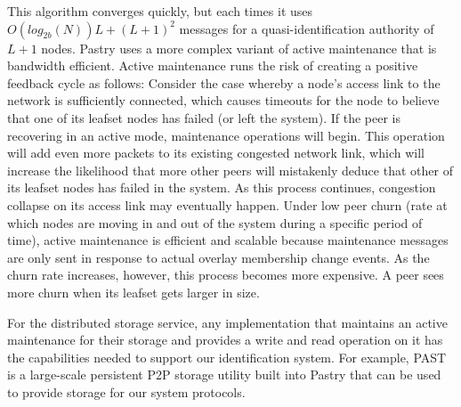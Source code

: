  This algorithm converges quickly, but each times it uses $O(log_{2b}(N))L + (L+1)^2$ messages
for a quasi-identification authority of $L+1$ nodes.
Pastry uses a more complex variant of active maintenance that is
bandwidth efficient.
Active maintenance runs the risk of creating a positive feedback cycle as
follows: Consider the case whereby a node's access link to the network is
sufficiently connected, which causes timeouts for the node to believe that one
of its leafset nodes has failed (or left the system). If the peer is recovering
in an active mode, maintenance operations will begin. This operation will add
even more packets to its existing congested network link, which will increase
the likelihood that more other peers will mistakenly deduce that other of its leafset
nodes has failed in the system. As this process continues, congestion collapse
on its access link may eventually happen.
Under low peer churn (rate at which nodes are moving in and out of the
system during a specific period of time), active maintenance is efficient and scalable because
maintenance messages are only sent in response to actual overlay membership
change events. As the churn rate increases, however, this process becomes more
expensive. A peer sees more churn when its leafset gets larger in size.

For the distributed storage service, any implementation that maintains an
active maintenance for their storage and provides a write and read operation on
it has the capabilities needed to support our identification system. For
example, PAST~\cite{druschel2001past} is a large-scale persistent P2P storage
utility built into Pastry that can be used to provide storage for our system
protocols.



%

